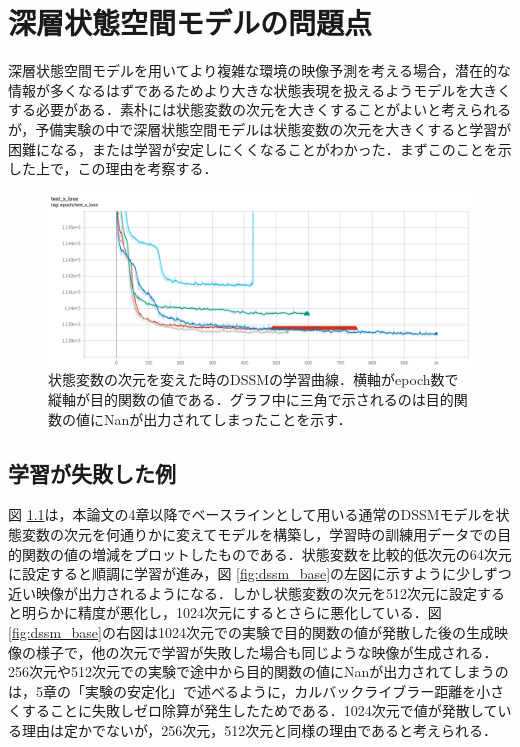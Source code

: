 \chapter{深層状態空間モデルの問題点}
\label{chap:baseline}

深層状態空間モデルを用いてより複雑な環境の映像予測を考える場合，潜在的な情報が多くなるはずであるためより大きな状態表現を扱えるようモデルを大きくする必要がある．素朴には状態変数の次元を大きくすることがよいと考えられるが，予備実験の中で深層状態空間モデルは状態変数の次元を大きくすると学習が困難になる，または学習が安定しにくくなることがわかった．まずこのことを示した上で，この理由を考察する．

\begin{figure}[bp]
  \begin{center}
    \includegraphics[width=\linewidth]{./figures/dssm_curve.png}
    \caption[状態変数の次元を変えた時のDSSMの学習曲線]{状態変数の次元を変えた時のDSSMの学習曲線．横軸がepoch数で縦軸が目的関数の値である．グラフ中に三角で示されるのは目的関数の値にNanが出力されてしまったことを示す．}
    \label{fig:dssm_curve}
  \end{center}
\end{figure}

\section{学習が失敗した例}
図 \ref{fig:dssm_curve}は，本論文の4章以降でベースラインとして用いる通常のDSSMモデルを状態変数の次元を何通りかに変えてモデルを構築し，学習時の訓練用データでの目的関数の値の増減をプロットしたものである．状態変数を比較的低次元の64次元に設定すると順調に学習が進み，図 \ref{fig:dssm_base}の左図に示すように少しずつ近い映像が出力されるようになる．しかし状態変数の次元を512次元に設定すると明らかに精度が悪化し，1024次元にするとさらに悪化している．図 \ref{fig:dssm_base}の右図は1024次元での実験で目的関数の値が発散した後の生成映像の様子で，他の次元で学習が失敗した場合も同じような映像が生成される．256次元や512次元での実験で途中から目的関数の値にNanが出力されてしまうのは，5章の「実験の安定化」で述べるように，カルバックライブラー距離を小さくすることに失敗しゼロ除算が発生したためである．1024次元で値が発散している理由は定かでないが，256次元，512次元と同様の理由であると考えられる．

